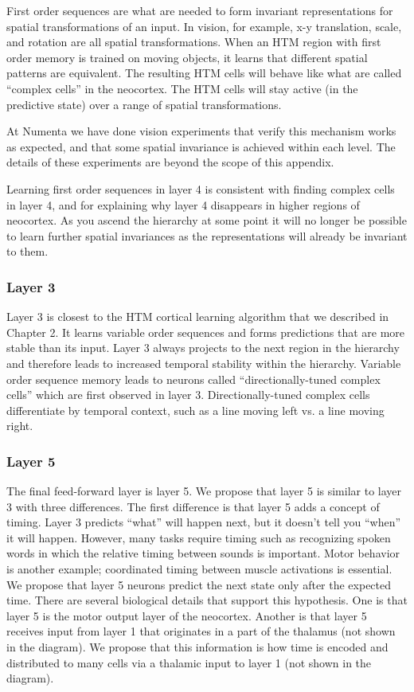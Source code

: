 \documentclass{report}
\begin{document}
First order sequences are what are needed to form invariant
representations for spatial transformations of an input. In vision,
for example, x-y translation, scale, and rotation are all spatial
transformations. When an HTM region with first order memory is trained
on moving objects, it learns that different spatial patterns are
equivalent. The resulting HTM cells will behave like what are called
``complex cells'' in the neocortex. The HTM cells will stay active (in
the predictive state) over a range of spatial transformations.

At Numenta we have done vision experiments that verify this mechanism
works as expected, and that some spatial invariance is achieved within
each level. The details of these experiments are beyond the scope of
this appendix.

Learning first order sequences in layer 4 is consistent with finding
complex cells in layer 4, and for explaining why layer 4 disappears in
higher regions of neocortex. As you ascend the hierarchy at some point
it will no longer be possible to learn further spatial invariances as
the representations will already be invariant to them.

\subsubsection*{Layer 3}
Layer 3 is closest to the HTM cortical learning algorithm that we
described in Chapter 2. It learns variable order sequences and forms
predictions that are more stable than its input. Layer 3 always
projects to the next region in the hierarchy and therefore leads to
increased temporal stability within the hierarchy. Variable order
sequence memory leads to neurons called ``directionally-tuned complex
cells'' which are first observed in layer 3. Directionally-tuned
complex cells differentiate by temporal context, such as a line moving
left vs. a line moving right.

\subsubsection*{Layer 5}
The final feed-forward layer is layer 5. We propose that layer 5 is
similar to layer 3 with three differences. The first difference is
that layer 5 adds a concept of timing. Layer 3 predicts ``what'' will
happen next, but it doesn't tell you ``when'' it will happen. However,
many tasks require timing such as recognizing spoken words in which
the relative timing between sounds is important. Motor behavior is
another example; coordinated timing between muscle activations is
essential. We propose that layer 5 neurons predict the next state only
after the expected time. There are several biological details that
support this hypothesis. One is that layer 5 is the motor output layer
of the neocortex. Another is that layer 5 receives input from layer 1
that originates in a part of the thalamus (not shown in the
diagram). We propose that this information is how time is encoded and
distributed to many cells via a thalamic input to layer 1 (not shown
in the diagram).
\end{document}
